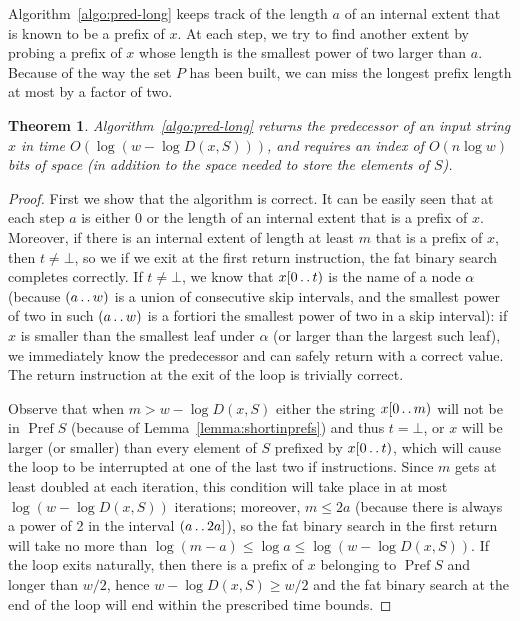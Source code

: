 \documentclass[a4paper,11pt]{article}
\newtheorem{theorem} {Theorem}[section]
\newcommand{\?}{\mskip1.5mu}
\def\..{\,\mathpunct{\ldotp\ldotp}} %
\DeclareMathOperator{\Pref}{Pref}
\begin{document}
Algorithm~\ref{algo:pred-long} keeps track of the length $a$ of an
internal extent that is known to be a prefix of $x$. At each step, we try to
find another extent by probing a prefix of $x$ whose length is the smallest power of two larger than
$a$. Because of the way the set $P$ has been built, we can miss the longest
prefix length at most by a factor of two. 

\begin{theorem}	
\label{thm:pred-long}
Algorithm~\ref{algo:pred-long} returns the predecessor of an input string $x$
in time $O(\log(w-\log D(x,S)))$, and requires an index of $O(n \log w)$ bits of space (in addition to the space needed to store the elements of $S$).
\end{theorem}
\begin{proof}
First we show that the algorithm is correct. It can be easily seen that at each
step $a$ is either 0 or the length of an internal extent that is a prefix of
$x$. Moreover, if there is an internal extent of length at least $m$ that is
a prefix of $x$, then $t\neq\bot$, so we if we exit at the first return
instruction, the fat binary search completes correctly. If $t\neq \bot$,
we know that $x[0\..t)$ is the name of a node $\alpha$
(because $(a\..w)$ is a union of consecutive skip intervals, and the smallest power of two in such $(a\..w)$ is
a fortiori the smallest power of two in a skip interval): if  
$x$ is smaller than the smallest leaf
under $\alpha$ (or larger than the largest such leaf), we immediately know the
predecessor and can safely return with a correct value. The return instruction
at the exit of the loop is trivially correct.

Observe that when $m>w-\log D(x,S)$
either the string $x[0\..m)$ will not be in $\Pref S$ (because of
Lemma~\ref{lemma:shortinprefs}) and thus $t=\bot$, or $x$ will be larger (or
smaller) than every element of $S$ prefixed by $x[0\..t)$, which will cause the
loop to be interrupted at one of the last two if instructions. 
Since $m$ gets at
least doubled at each iteration, this condition will take place in at most $\log(w-\log D(x,S))$ iterations; moreover, $m\leq 2a$ (because there is always a power of 2 in the interval $(a\..2a]$), so the fat binary search in the first
return will take no more than $\log(m-a)\leq \log a\leq \log (w-\log D(x,S))$.
If the loop exits naturally, then there is a prefix of $x$ belonging to $\Pref
S$ and longer than $w/2$, hence $w-\log D(x,S)\geq w/2$ and the fat binary
search at the end of the loop will end within the prescribed time bounds.
\end{proof}
\end{document}
